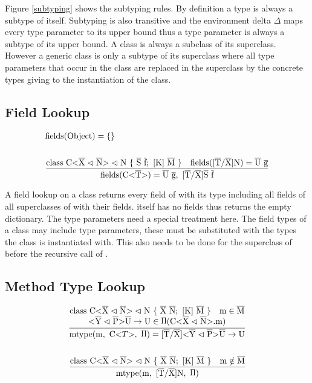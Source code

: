 Figure \ref{subtyping} shows the subtyping rules. By definition a type is always a subtype of itself. Subtyping is also transitive and the environment delta $\Delta$ maps every type parameter to its upper bound thus a type parameter is always a subtype of its upper bound.
A class is always a subclass of its superclass. However a generic class is only a subtype of its superclass where all type parameters that occur in the class are replaced in the superclass by the concrete types giving to the instantiation of the class.

\subsection{Field Lookup}

\begin{align*}
    &\text{fields}(\text{Object}) = \{\}\\
    \\
    &\frac{\class{S}{f} \quad \text{fields}(\tsxsn{T}{X}{N}) = \ot{U} \ \ot{g} }{\text{fields}(\nvt{C}{T}) = \ot{U} \ \ot{g}, \ \tsxsns{T}{X}{S} \ \ot{f}}\\
\end{align*}

A field lookup on a class  returns every field of  with its type including all fields of all superclasses of  with their fields.  itself has no fields thus  returns the empty dictionary.
The type parameters need a special treatment here. The field types of a class  may include type parameters, these must be substituted with the types the class is instantiated with. This also needs to be done for the superclass of  before the recursive call of .

\subsection{Method Type Lookup}

\begin{align*}
    \frac{
        \begin{matrix}
            \class{X}{N} \quad \text{m} \in \ot{M} \\
            \yp \oto{\text{U}} \in \sprod{.7} (\cm)
        \end{matrix}
    }{\mtypeC{\nvtt{C}{T}} = \tsxsn{T}{X}{} \yp \oto{\text{U}}}
    \\
    \\
    \frac{\class{X}{N} \quad \text{m} \notin \ot{M}}{\mtypeC{\tsxsn{T}{X}{N}}}
\end{align*}

